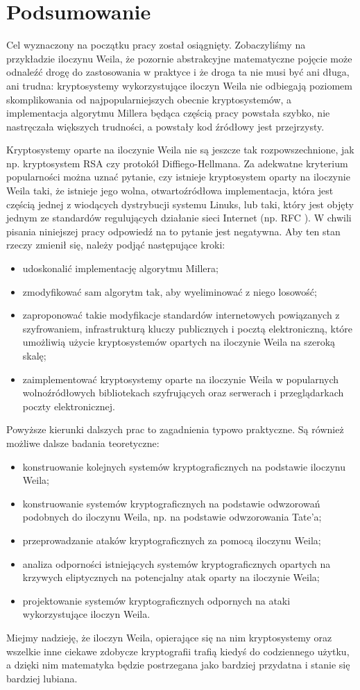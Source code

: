 \chapter*{Podsumowanie}

\noindent
Cel wyznaczony na początku pracy został osiągnięty.
Zobaczyliśmy na przykładzie iloczynu Weila,
że pozornie abstrakcyjne matematyczne pojęcie
może odnaleźć drogę do zastosowania w praktyce
i że droga ta nie musi być ani długa, ani trudna:
kryptosystemy wykorzystujące iloczyn Weila
nie odbiegają poziomem skomplikowania
od najpopularniejszych obecnie kryptosystemów,
a implementacja algorytmu Millera będąca częścią pracy
powstała szybko, nie nastręczała większych trudności,
a powstały kod źródłowy jest przejrzysty.

\noindent
Kryptosystemy oparte na iloczynie Weila nie są jeszcze tak rozpowszechnione,
jak np. kryptosystem RSA czy protokół Diffiego-Hellmana.
Za adekwatne kryterium popularności można uznać pytanie,
czy istnieje kryptosystem oparty na iloczynie Weila taki,
że istnieje jego wolna, otwartoźródłowa implementacja,
która jest częścią jednej z wiodących dystrybucji systemu Linuks,
lub taki,
który jest objęty jednym ze standardów regulujących działanie
sieci Internet (np. RFC \cite{rfc}).
W chwili pisania niniejszej pracy odpowiedź na to pytanie jest negatywna.
Aby ten stan rzeczy zmienił się,
należy podjąć następujące kroki:
\begin{itemize}
\item
udoskonalić implementację algorytmu Millera;
\item
zmodyfikować sam algorytm tak, aby wyeliminować z niego losowość;
\item
zaproponować takie modyfikacje standardów internetowych
powiązanych z szyfrowaniem,
infrastrukturą kluczy publicznych
i pocztą elektroniczną,
które umożliwią użycie kryptosystemów opartych na iloczynie Weila
na szeroką skalę;
\item
zaimplementować kryptosystemy oparte na iloczynie Weila
w popularnych wolnoźródłowych bibliotekach szyfrujących
oraz serwerach i przeglądarkach poczty elektronicznej.
\end{itemize}

\noindent
Powyższe kierunki dalszych prac to zagadnienia typowo praktyczne.
Są również możliwe dalsze badania teoretyczne:
\begin{itemize}
\item
konstruowanie kolejnych systemów kryptograficznych
na podstawie iloczynu Weila;
\item
konstruowanie systemów kryptograficznych
na podstawie odwzorowań podobnych do iloczynu Weila,
np. na podstawie odwzorowania Tate'a;
\item
przeprowadzanie ataków kryptograficznych za pomocą iloczynu Weila;
\item
analiza odporności istniejących systemów kryptograficznych
opartych na krzywych eliptycznych
na potencjalny atak oparty na iloczynie Weila;
\item
projektowanie systemów kryptograficznych odpornych na ataki
wykorzystujące iloczyn Weila.
\end{itemize}

\noindent
Miejmy nadzieję, że iloczyn Weila,
opierające się na nim kryptosystemy
oraz wszelkie inne ciekawe zdobycze kryptografii
trafią kiedyś do codziennego użytku,
a dzięki nim matematyka będzie postrzegana jako bardziej przydatna
i stanie się bardziej lubiana.
